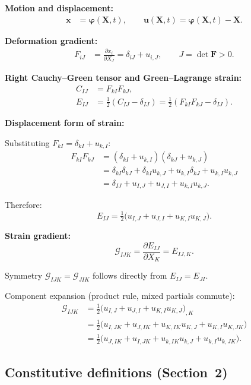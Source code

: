 \documentclass[11pt]{article}
\newcommand{\bX}{\mathbf{X}}
\newcommand{\bx}{\mathbf{x}}
\newcommand{\bp}{\boldsymbol{\varphi}}
\newcommand{\bu}{\mathbf{u}}
\newcommand{\bX}{\mathbf{X}}
\newcommand{\bx}{\mathbf{x}}
\newcommand{\bp}{\boldsymbol{\varphi}}
\newcommand{\bu}{\mathbf{u}}
\begin{document}
\textbf{Motion and displacement:}
\begin{align}
\bx &= \bp(\bX,t), \qquad \bu(\bX,t) = \bp(\bX,t) - \bX.
\end{align}

\textbf{Deformation gradient:}
\begin{align}
F_{iJ} &= \frac{\partial x_{i}}{\partial X_{J}}
= \delta_{iJ} + u_{i,J},
\qquad
J = \det\mathbf{F} > 0.
\end{align}

\textbf{Right Cauchy--Green tensor and Green--Lagrange strain:}
\begin{align}
C_{IJ} &= F_{kI}F_{kJ},
\\
E_{IJ} &= \tfrac12(C_{IJ}-\delta_{IJ})
= \tfrac12(F_{kI}F_{kJ}-\delta_{IJ}).
\end{align}

\textbf{Displacement form of strain:}

Substituting $F_{kI}=\delta_{kI}+u_{k,I}$:
\begin{align}
F_{kI}F_{kJ} &= (\delta_{kI}+u_{k,I})(\delta_{kJ}+u_{k,J})
\nonumber\\
&= \delta_{kI}\delta_{kJ} + \delta_{kI}u_{k,J}
   + u_{k,I}\delta_{kJ} + u_{k,I}u_{k,J}
\nonumber\\
&= \delta_{IJ} + u_{I,J} + u_{J,I} + u_{k,I}u_{k,J}.
\end{align}

Therefore:
\begin{equation}
E_{IJ} = \tfrac12\bigl(u_{I,J} + u_{J,I} + u_{K,I}u_{K,J}\bigr).
\end{equation}

\textbf{Strain gradient:}
\begin{equation}
\mathcal{G}_{IJK} = \frac{\partial E_{IJ}}{\partial X_{K}}
= E_{IJ,K}.
\end{equation}

Symmetry $\mathcal{G}_{IJK}=\mathcal{G}_{JIK}$ follows directly
from $E_{IJ}=E_{JI}$.

Component expansion (product rule, mixed partials commute):
\begin{align}
\mathcal{G}_{IJK}
&= \tfrac12\bigl(u_{I,J}+u_{J,I}+u_{K,I}u_{K,J}\bigr)_{,K}
\nonumber\\
&= \tfrac12\bigl(u_{I,JK}+u_{J,IK}+u_{K,IK}u_{K,J}
   +u_{K,I}u_{K,JK}\bigr)
\nonumber\\
&= \tfrac12\bigl(u_{J,IK}+u_{I,JK}
   +u_{k,IK}u_{k,J}+u_{k,I}u_{k,JK}\bigr).
\end{align}

\subsection{Constitutive definitions (Section~2)}
\end{document}
